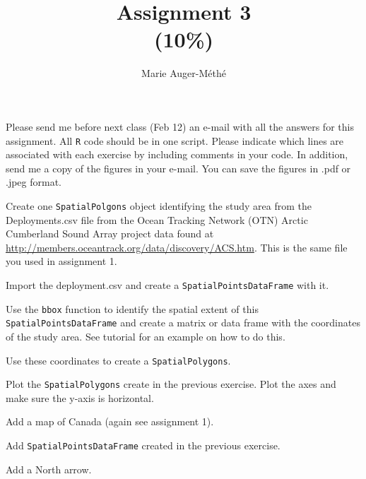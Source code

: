 \documentclass[11pt, oneside]{article}   	%
\title{Assignment 3 \\ \large(10\%)}
\author{Marie Auger-M\'eth\'e}
\date{}							%
\begin{document}
\maketitle

Please send me before next class (Feb 12) an e-mail with all the answers for this assignment. All \texttt{R} code should be in one script. Please indicate which lines are associated with each exercise by including comments in your code. In addition, send me a copy of the figures in your e-mail. You can save the figures in .pdf or .jpeg format.

\begin{Exercise}

Create one \texttt{SpatialPolgons} object identifying the study area from the Deployments.csv file from the Ocean Tracking Network (OTN) Arctic Cumberland Sound Array project data found at \url{http://members.oceantrack.org/data/discovery/ACS.htm}. This is the same file you used in assignment 1.

\Question
Import the deployment.csv  and create a \texttt{SpatialPointsDataFrame} with it.

\Question Use the \texttt{bbox} function to  identify the spatial extent of this \texttt{SpatialPointsDataFrame} and create a matrix or data frame with the coordinates of the study area. See tutorial for an example on how to do this.

\Question Use these coordinates to create a \texttt{SpatialPolygons}.

\end{Exercise}

\begin{Exercise}

\Question Plot the \texttt{SpatialPolygons} create in the previous exercise. Plot the axes and make sure the y-axis is horizontal.

\Question Add a map of Canada (again see assignment 1). 

\Question Add \texttt{SpatialPointsDataFrame} created in the previous exercise.

\Question Add a North arrow.

\end{Exercise}
\end{document}
